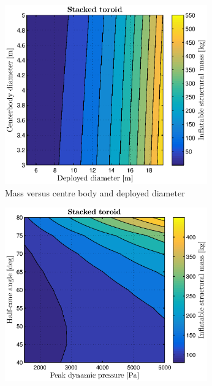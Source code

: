 \begin{figure}[h]
	\centering

	\begin{subfigure}[b]{0.49\textwidth}
		\includegraphics[width=0.96\textwidth]{./Figure/Structure/diameters_test.eps}
		\caption{Mass versus centre body and deployed diameter}
		\label{fig:diameters_strucmass}
	\end{subfigure}
	\begin{subfigure}[b]{0.49\textwidth}
		\includegraphics[width=0.96\textwidth]{./Figure/Structure/halfcone_test.eps}

\end{subfigure}
\end{figure}
